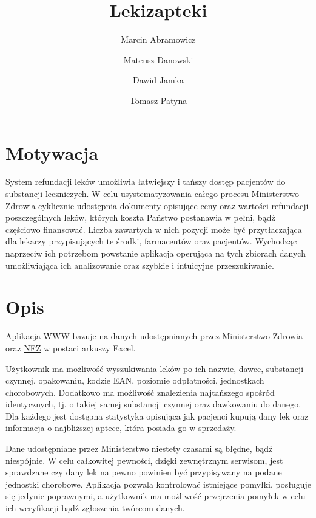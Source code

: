 \documentclass{article}
\title{Lekizapteki}
\author{Marcin Abramowicz \and Mateusz Danowski \and Dawid Jamka \and Tomasz Patyna}
\begin{document}
  \maketitle


  \section{Motywacja}

  System refundacji leków umożliwia łatwiejszy i tańszy dostęp pacjentów do substancji leczniczych.
  W celu usystematyzowania całego procesu Ministerstwo Zdrowia cyklicznie udostępnia dokumenty opisujące ceny oraz wartości refundacji poszczególnych leków, których koszta Państwo postanawia w pełni, bądź częściowo finansować.
  Liczba zawartych w nich pozycji może być przytłaczająca dla lekarzy przypisujących te środki, farmaceutów oraz pacjentów.
  Wychodząc naprzeciw ich potrzebom powstanie aplikacja operująca na tych zbiorach danych umożliwiająca ich analizowanie oraz szybkie i intuicyjne przeszukiwanie.


  \section{Opis}

  Aplikacja WWW bazuje na danych udostępnianych przez
  \href{https://www.gov.pl/web/zdrowie/obwieszczenia-ministra-zdrowia-lista-lekow-refundowanych?fbclid=IwAR1U3YB3yON5EN2s1qdYRbcIeh7iDxqeOtQoEYGFvX9ozGDWdURIK2JOMRs}
  {Ministerstwo Zdrowia}
  oraz \href{https://www.nfz.gov.pl/aktualnosci/aktualnosci-centrali/komunikat-dgl,7465.html?fbclid=IwAR0F41XjLwTg7XQdUjeYpE_KS4VVZk50etlbYDpwxhxOR2ZLdslMatUtbEU}{NFZ}
  w postaci arkuszy Excel.

  Użytkownik ma możliwość wyszukiwania leków po ich nazwie, dawce, substancji czynnej, opakowaniu, kodzie EAN, poziomie odpłatności, jednostkach chorobowych.
  Dodatkowo ma możliwość znalezienia najtańszego spośród identycznych, tj. o takiej samej substancji czynnej oraz dawkowaniu do danego.
  Dla każdego jest dostępna statystyka opisująca jak pacjenci kupują dany lek oraz informacja o najbliższej aptece, która posiada go w sprzedaży.

  Dane udostępniane przez Ministerstwo niestety czasami są błędne, bądź niespójnie.
  W celu całkowitej pewności, dzięki zewnętrznym serwisom, jest sprawdzane czy dany lek na pewno powinien być przypisywany na podane jednostki chorobowe.
  Aplikacja pozwala kontrolować istniejące pomyłki, posługuje się jedynie poprawnymi, a użytkownik ma możliwość przejrzenia pomyłek w celu ich weryfikacji bądź zgłoszenia twórcom danych.
\end{document}
